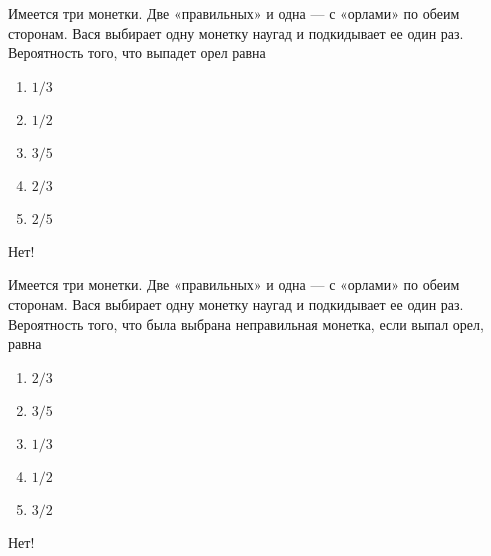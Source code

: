 \documentclass[t]{beamer}
\begin{document}
 \begin{frame} \label{5-No} 
\begin{block}{5} 

Имеется три монетки. Две «правильных» и одна — с «орлами» по обеим сторонам. Вася выбирает одну монетку наугад и подкидывает ее один раз. Вероятность того, что выпадет орел равна
     


 \end{block} 
\begin{enumerate} 
\item[] \hyperlink{5-No}{\beamergotobutton{} $1/3$}
\item[] \hyperlink{5-No}{\beamergotobutton{} $1/2$}
\item[] \hyperlink{5-No}{\beamergotobutton{} $3/5$}
\item[] \hyperlink{5-Yes}{\beamergotobutton{} $2/3$}
\item[] \hyperlink{5-No}{\beamergotobutton{} $2/5$
}
\end{enumerate} 

 \alert{Нет!} 
\end{frame} 


 \begin{frame} \label{6-No} 
\begin{block}{6} 

Имеется три монетки. Две «правильных» и одна — с «орлами» по обеим сторонам. Вася выбирает одну монетку наугад и подкидывает ее один раз. Вероятность того, что была выбрана неправильная монетка, если выпал орел, равна
   


 \end{block} 
\begin{enumerate} 
\item[] \hyperlink{6-No}{\beamergotobutton{} $2/3$}
\item[] \hyperlink{6-No}{\beamergotobutton{} $3/5$}
\item[] \hyperlink{6-No}{\beamergotobutton{} $1/3$}
\item[] \hyperlink{6-Yes}{\beamergotobutton{} $1/2$}
\item[] \hyperlink{6-No}{\beamergotobutton{} $3/2$
}
\end{enumerate} 

 \alert{Нет!} 
\end{frame} 
\end{document}
